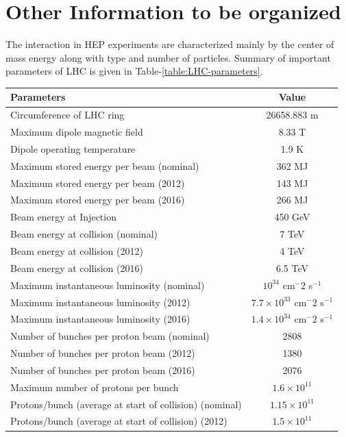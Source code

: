 \section{Other Information to be organized}



The interaction in HEP experiments are characterized mainly by the center of mass energy along with type and number of particles. Summary of important parameters of LHC is given in Table-\ref{table:LHC-parameters}.

\begin{table}
\centering
\begin{tabular}[!ht]{l c}
\hline
{\bf Parameters} & {\bf Value} \\
\hline
Circumference of LHC ring   &   26658.883 m \\
\hline
Maximum dipole magnetic field   & 8.33 T \\
Dipole operating temperature    & 1.9 K \\
\hline
Maximum stored energy per beam (nominal) &   362 MJ \\
Maximum stored energy per beam  (2012) &   143 MJ \\
Maximum stored energy per beam  (2016) &   266 MJ \\
\hline
Beam energy at Injection    & 450 GeV \\
Beam energy at collision (nominal) &    7 TeV \\
Beam energy at collision (2012)     &   4 TeV \\
Beam energy at collision (2016)     &   6.5 TeV \\
\hline
Maximum instantaneous luminosity (nominal)  &   $10^{34}$ cm$^-2$ s$^{-1}$ \\
Maximum instantaneous luminosity (2012)     &   $7.7 \times 10^{33}$ cm$^-2$ s$^{-1}$ \\
Maximum instantaneous luminosity (2016)     &   $1.4 \times 10^{34}$ cm$^-2$ s$^{-1}$ \\
\hline
Number of bunches per proton beam (nominal) &   2808 \\
Number of bunches per proton beam (2012)    &   1380 \\
Number of bunches per proton beam (2016)    &   2076 \\
Maximum number of protons per bunch         &   $1.6 \times 10^{11}$ \\
\hline
Protons/bunch (average at start of collision) (nominal)   &   $1.15 \times 10^{11}$ \\
Protons/bunch (average at start of collision) (2012)  &   $1.5 \times 10^{11}$ \\

\end{tabular}
\end{table}
